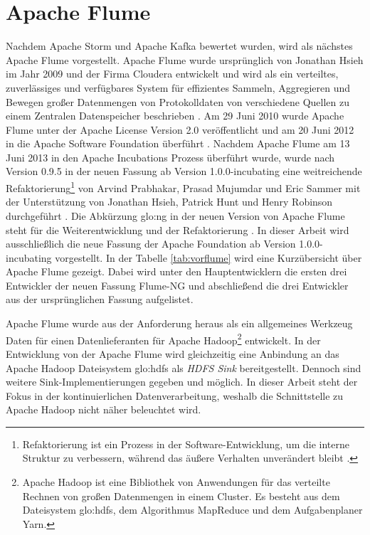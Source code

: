 \section{Apache Flume}

Nachdem Apache Storm und Apache Kafka bewertet wurden, wird als nächstes Apache Flume vorgestellt. Apache Flume wurde ursprünglich von Jonathan Hsieh im Jahr 2009 und der Firma Cloudera entwickelt und wird als ein verteiltes, zuverlässiges und verfügbares System für effizientes Sammeln, Aggregieren und Bewegen großer Datenmengen von Protokolldaten von verschiedene Quellen zu einem Zentralen Datenspeicher beschrieben . Am 29 Juni 2010 wurde Apache Flume unter der Apache License Version 2.0 veröffentlicht und am 20 Juni 2012 in die Apache Software Foundation überführt . Nachdem Apache Flume am 13 Juni 2013 in den Apache Incubations Prozess überführt wurde, wurde nach Version 0.9.5 in der neuen Fassung ab Version 1.0.0-incubating eine weitreichende Refaktorierung\footnote{Refaktorierung ist ein Prozess in der Software-Entwicklung, um die interne Struktur zu verbessern, während das äußere Verhalten unverändert bleibt .} von Arvind Prabhakar, Prasad Mujumdar und Eric Sammer mit der Unterstützung von Jonathan Hsieh, Patrick Hunt und Henry Robinson durchgeführt . Die Abkürzung \gls{glo:ng} in der neuen Version von Apache Flume steht für die Weiterentwicklung und der Refaktorierung . In dieser Arbeit wird ausschließlich die neue Fassung der Apache Foundation ab Version 1.0.0-incubating vorgestellt. In der Tabelle \ref{tab:vorflume} wird eine Kurzübersicht über Apache Flume gezeigt. Dabei wird unter den Hauptentwicklern die ersten drei Entwickler der neuen Fassung Flume-NG und abschließend die drei Entwickler aus der ursprünglichen Fassung aufgelistet.

Apache Flume wurde aus der Anforderung heraus als ein allgemeines Werkzeug Daten für einen Datenlieferanten für Apache Hadoop\footnote{Apache Hadoop ist eine Bibliothek von Anwendungen für das verteilte Rechnen von großen Datenmengen in einem Cluster. Es besteht aus dem Dateisystem \gls{glo:hdfs}, dem Algorithmus MapReduce und dem Aufgabenplaner Yarn. } entwickelt. In der Entwicklung von der Apache Flume wird gleichzeitig eine Anbindung an das Apache Hadoop Dateisystem \gls{glo:hdfs} als \textit{HDFS Sink} bereitgestellt. Dennoch sind weitere Sink-Implementierungen gegeben und möglich. In dieser Arbeit steht der Fokus in der kontinuierlichen Datenverarbeitung, weshalb die Schnittstelle zu Apache Hadoop nicht näher beleuchtet wird. 

